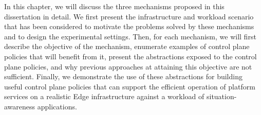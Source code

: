 \par In this chapter, we will discuss the three mechanisms proposed in this dissertation in detail. We first present the infrastructure and workload scenario that has been considered to motivate the problems solved by these mechanisms and to design the experimental settings. Then, for each mechanism, we will first describe the objective of the mechanism, enumerate examples of control plane policies that will benefit from it, present the abstractions exposed to the control plane policies, and why previous approaches at attaining this objective are not sufficient. Finally, we demonstrate the use of these abstractions for building useful control plane policies that can support the efficient operation of platform services on a realistic Edge infrastructure against a workload of situation-awareness applications. 

